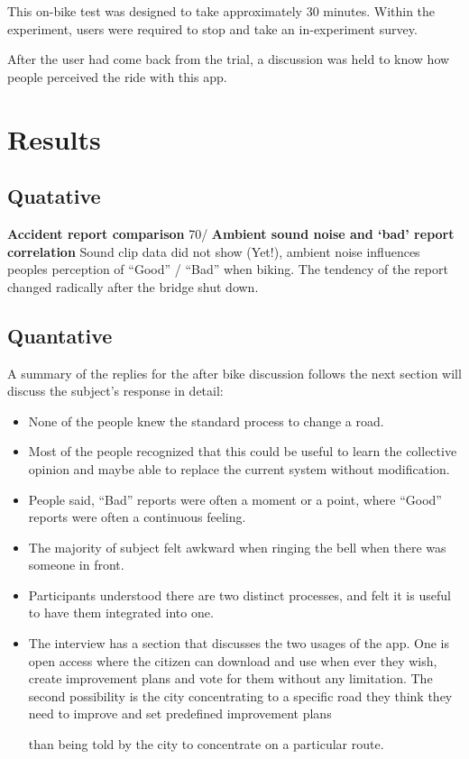 This on-bike test was designed to take approximately 30 minutes. Within the
experiment, users were required to stop and take an in-experiment survey.

After the user had come back from the trial, a discussion was held to know
how people perceived the ride with this app.

% 
\section{Results}
\subsection{Quatative}
\textbf{Accident report comparison}
70/%
\textbf{Ambient sound noise and `bad' report correlation}
Sound clip data did not show (Yet!), ambient noise influences
    peoples perception of ``Good'' / ``Bad'' when biking.
The tendency of the report changed radically after the bridge shut down.

\subsection{Quantative}
A summary of the replies for the after bike discussion follows the next section will discuss the subject's response in detail:
\begin{itemize}
\item None of the people knew the standard process to change a road. 
\item Most of the people recognized that this could be useful to learn the collective opinion and maybe able to replace the current system without modification.
\item People said, ``Bad'' reports were often a moment or a point, where ``Good'' reports were often a continuous feeling.
  \item The majority of subject felt awkward when ringing the bell when there was someone in front.
\item Participants understood there are two distinct processes, and felt it is useful to have them integrated into one.
\item The interview has a section that discusses the two usages of the app. One is open access where the citizen can download and use when ever they wish, create improvement plans and vote for them without any limitation. The second possibility is the city concentrating to a specific road they think they need to improve and set predefined improvement plans 

    than being told by the city to concentrate on a particular route.
\end{itemize}


